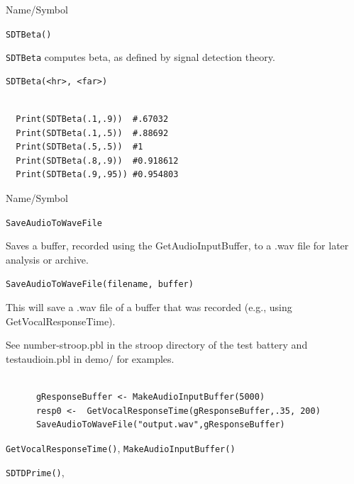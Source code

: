 \begin{desc}{Name/Symbol}
\item[Name/Symbol] 	\verb+SDTBeta()+

\item[Description] \verb+SDTBeta+ computes beta, as defined by signal detection theory.  

\item[Usage]        	
\begin{verbatim}
SDTBeta(<hr>, <far>)
\end{verbatim}

\item[Example] 	
\begin{verbatim}

  Print(SDTBeta(.1,.9))  #.67032
  Print(SDTBeta(.1,.5))  #.88692
  Print(SDTBeta(.5,.5))  #1
  Print(SDTBeta(.8,.9))  #0.918612
  Print(SDTBeta(.9,.95)) #0.954803
\end{verbatim}


\begin{desc}{Name/Symbol}
\item[Name/Symbol]	\verb+SaveAudioToWaveFile+

\item[Description] Saves a buffer, recorded using the GetAudioInputBuffer, to a .wav file for later analysis or archive.


\item[Usage]
\begin{verbatim}
SaveAudioToWaveFile(filename, buffer)
\end{verbatim}

This will save a .wav file of a buffer that was recorded (e.g., using GetVocalResponseTime).

See number-stroop.pbl in the stroop directory of the test battery and testaudioin.pbl in demo/ for examples.


\item[Example]	
\begin{verbatim}

      gResponseBuffer <- MakeAudioInputBuffer(5000)
	  resp0 <-  GetVocalResponseTime(gResponseBuffer,.35, 200)
      SaveAudioToWaveFile("output.wav",gResponseBuffer)		

\end{verbatim}
\item[See Also] 	\verb+GetVocalResponseTime()+, \verb+MakeAudioInputBuffer()+
\end{desc}




\item[See Also]\verb+SDTDPrime()+,
\end{desc}
